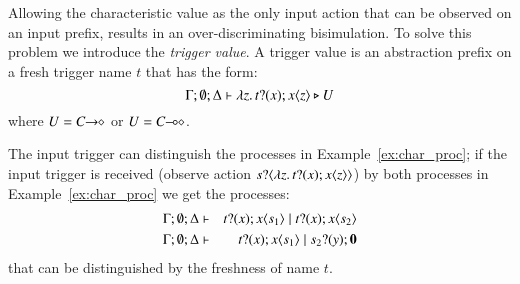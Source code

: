 
Allowing the characteristic value as the only input action
that can be observed on an input prefix,
results in an over-discriminating bisimulation.
To solve this problem we introduce the {\em trigger value}.
A trigger value is an abstraction 
prefix on a fresh trigger name $t$ that has the form:
%
\[
	\Gamma; \emptyset; \Delta \vdash \lambda z.\,t ? (x) ; x\langle z \rangle \triangleright U
\]
%
\noi where $U = C\!\! \rightarrow\!\! \diamond$ or $U = C\!\! \multimap\!\! \diamond$.

The input trigger can distinguish the processes in Example~\ref{ex:char_proc};
if the input trigger is received (observe action $s ? \langle \lambda z.\,t ? (x) ; x\langle z \rangle \rangle$)
by both processes in Example~\ref{ex:char_proc} we get the processes:
%
\begin{eqnarray*}
	\Gamma; \emptyset; \Delta &\vdash& t ? (x) ; x\langle s_1 \rangle \;|\; t ? (x) ; x\langle s_2 \rangle
	\\
	\Gamma; \emptyset; \Delta &\vdash& t ? (x) ; x\langle s_1 \rangle \;|\; s_2 ? (y) ; \mathbf{0}
\end{eqnarray*}
%
\noi that can be distinguished by the freshness of name $t$.

